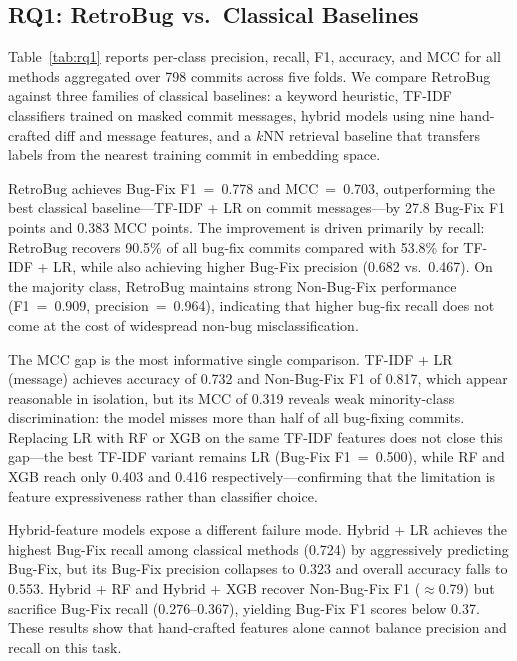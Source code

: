 
\subsection{RQ1: RetroBug vs.\ Classical Baselines}
\label{sec:results:rq1}

Table~\ref{tab:rq1} reports per-class precision, recall, F1, accuracy,
and MCC for all methods aggregated over 798 commits across five folds.
We compare RetroBug against three families of classical baselines:
a keyword heuristic, TF-IDF classifiers trained on masked commit
messages, hybrid models using nine hand-crafted diff and message
features, and a $k$NN retrieval baseline that transfers labels from
the nearest training commit in embedding space.

RetroBug achieves Bug-Fix F1~=~0.778 and MCC~=~0.703, outperforming
the best classical baseline---TF-IDF + LR on commit messages---by
27.8 Bug-Fix F1 points and 0.383 MCC points.
The improvement is driven primarily by recall: RetroBug recovers
90.5\% of all bug-fix commits compared with 53.8\% for TF-IDF + LR,
while also achieving higher Bug-Fix precision (0.682 vs.\ 0.467).
On the majority class, RetroBug maintains strong Non-Bug-Fix
performance (F1~=~0.909, precision~=~0.964), indicating that higher
bug-fix recall does not come at the cost of widespread non-bug
misclassification.

The MCC gap is the most informative single comparison.
TF-IDF + LR (message) achieves accuracy of 0.732 and Non-Bug-Fix F1
of 0.817, which appear reasonable in isolation, but its MCC of 0.319
reveals weak minority-class discrimination: the model misses more
than half of all bug-fixing commits.
Replacing LR with RF or XGB on the same TF-IDF features does not
close this gap---the best TF-IDF variant remains LR (Bug-Fix
F1~=~0.500), while RF and XGB reach only 0.403 and 0.416
respectively---confirming that the limitation is feature
expressiveness rather than classifier choice.

Hybrid-feature models expose a different failure mode.
Hybrid + LR achieves the highest Bug-Fix recall among classical
methods (0.724) by aggressively predicting Bug-Fix, but its Bug-Fix
precision collapses to 0.323 and overall accuracy falls to 0.553.
Hybrid + RF and Hybrid + XGB recover Non-Bug-Fix F1 ($\approx$0.79)
but sacrifice Bug-Fix recall (0.276--0.367), yielding Bug-Fix F1
scores below 0.37.
These results show that hand-crafted features alone cannot balance
precision and recall on this task.

